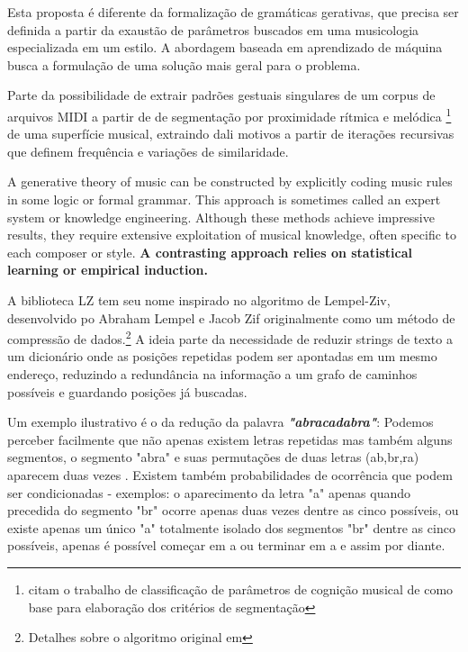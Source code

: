 \documentclass[
	12pt,				%
	openright,			%
	twoside,			%
	a4paper,			%
	english,			%
	french,				%
	spanish,			%
	brazil				%
	]{abntex2}
\begin{document}
Esta proposta é diferente da formalização de gramáticas gerativas, que precisa ser definida a partir da exaustão de parâmetros buscados em uma musicologia especializada em um estilo. A abordagem baseada em aprendizado de máquina busca a formulação de uma solução mais geral para o problema.

Parte da possibilidade de extrair padrões gestuais singulares de um corpus de arquivos MIDI a partir de de segmentação por proximidade rítmica e melódica \footnote{  citam o trabalho de classificação de parâmetros de cognição musical de  como base para elaboração dos critérios de segmentação } de uma superfície musical, extraindo dali motivos a partir de iterações recursivas que definem frequência e variações de similaridade.

\begin{citacao}
A generative theory of music can be constructed by explicitly coding music rules in some logic or
formal grammar. This approach is sometimes called an expert system or knowledge engineering.
Although these methods achieve impressive results, they require extensive exploitation of musical
knowledge, often specific to each composer or style.
\textbf{A contrasting approach relies on statistical learning
or empirical induction.}\cite[ p.74, grifos nossos]{dubnov2003using}
\end{citacao}

A biblioteca LZ tem seu nome inspirado no algoritmo de Lempel-Ziv, desenvolvido po Abraham Lempel e Jacob Zif originalmente como um método de compressão de dados.\footnote{Detalhes sobre o algoritmo original em } A ideia parte da necessidade de reduzir strings de texto a um dicionário onde as posições repetidas podem ser apontadas em um mesmo endereço, reduzindo a redundância na informação a um grafo de caminhos possíveis e guardando posições já buscadas.

Um exemplo ilustrativo é o da redução da palavra \textbf{\textit{"abracadabra"}}: Podemos perceber facilmente que não apenas existem letras repetidas mas também alguns segmentos, o segmento "abra" e suas permutações de duas letras (ab,br,ra) aparecem duas vezes . Existem também probabilidades de ocorrência que podem ser condicionadas - exemplos: o aparecimento da letra "a" apenas quando precedida do segmento "br" ocorre apenas duas vezes dentre as cinco possíveis, ou existe apenas um único "a" totalmente isolado dos segmentos "br" dentre as cinco possíveis, apenas é possível começar em a ou terminar em a e assim por diante.
\end{document}
